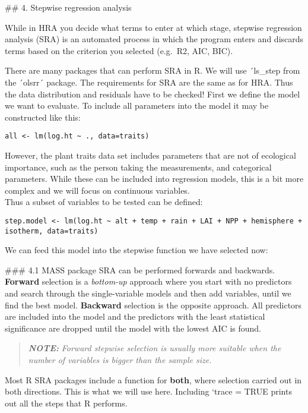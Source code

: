\documentclass[
]{article}
\begin{document}
\#\# 4. Stepwise regression analysis

While in HRA you decide what terms to enter at which stage, stepwise
regression analysis (SRA) is an automated process in which the program
enters and discards terms based on the criterion you selected (e.g.~R2,
AIC, BIC).

There are many packages that can perform SRA in R. We will use ´ls\_step
from the ´olsrr´ package. The requirements for SRA are the same as for
HRA. Thus the data distribution and residuals have to be checked! First
we define the model we want to evaluate. To include all parameters into
the model it may be constructed like this:

\begin{verbatim}
all <- lm(log.ht ~ ., data=traits)
\end{verbatim}

However, the plant traits data set includes parameters that are not of
ecological importance, such as the person taking the measurements, and
categorical parameters. While these can be included into regression
models, this is a bit more complex and we will focus on continuous
variables.\\
Thus a subset of variables to be tested can be defined:

\begin{verbatim}
step.model <- lm(log.ht ~ alt + temp + rain + LAI + NPP + hemisphere + isotherm, data=traits)
\end{verbatim}

We can feed this model into the stepwise function we have selected now:

\#\#\# 4.1 MASS package SRA can be performed forwards and backwards.
\textbf{Forward} selection is a \emph{bottom-up} approach where you
start with no predictors and search through the single-variable models
and then add variables, until we find the best model. \textbf{Backward}
selection is the opposite approach. All predictors are included into the
model and the predictors with the least statistical significance are
dropped until the model with the lowest AIC is found.

\begin{quote}
\textbf{\emph{NOTE:}} \emph{Forward stepwise selection is usually more
suitable when the number of variables is bigger than the sample size.}
\end{quote}

Most R SRA packages include a function for \textbf{both}, where
selection carried out in both directions. This is what we will use here.
Including `trace = TRUE prints out all the steps that R performs.
\end{document}
